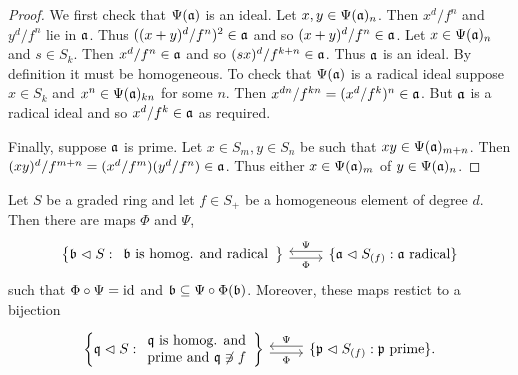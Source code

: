\documentclass{memoir}
\begin{document}
\begin{proof}
    We first check that $\Psi(\mathfrak{a})$ is an ideal.
    Let $x,y\in \Psi(\mathfrak{a})_n$.
    Then $x^d/f^n$ and $y^d/f^n$ lie in $\mathfrak{a}$.
    Thus $((x+y)^d/f^n)^2\in \mathfrak{a}$ and so $(x+y)^d/f^n\in \mathfrak{a}$.
    Let $x\in\Psi(\mathfrak{a})_n$ and $s\in S_k$.
    Then $x^d/f^n\in \mathfrak{a}$ and so $(sx)^d/f^{k+n}\in \mathfrak{a}$.
    Thus $\mathfrak{a}$ is an ideal.
    By definition it must be homogeneous.
    To check that $\Psi(\mathfrak{a})$ is a radical ideal suppose $x\in S_k$ and $x^n\in \Psi(\mathfrak{a})_{kn}$ for some $n$.
    Then $x^{dn}/f^{kn} = (x^d/f^k)^n\in \mathfrak{a}$.
    But $\mathfrak{a}$ is a radical ideal and so $x^d/f^k\in \mathfrak{a}$ as required.

    Finally, suppose $\mathfrak{a}$ is prime.
    Let $x\in S_m,y\in S_n$ be such that $xy\in \Psi(\mathfrak{a})_{m+n}$.
    Then $(xy)^d/f^{m+n} = (x^d/f^m)(y^d/f^n)\in \mathfrak{a}$.
    Thus either $x\in \Psi(\mathfrak{a})_m$ of $y\in \Psi(\mathfrak{a})_n$.
\end{proof}
\begin{thm}
    \label{thm:f_loc}
    Let $S$ be a graded ring and let $f\in S_+$ be a homogeneous element of degree $d$.
    Then there are maps $\Phi$ and $\Psi$,
    \begin{equation}
        \begin{tikzcd}
            \left\{\mf b \normal S : \begin{array}{c} \mf b \text{ is homog. and radical}\end{array}\right\} \arrow[r,shift right,swap,"\Phi"] & \set{\mf a \normal S_{(f)}: \mf a\text{ radical}} \arrow[l,shift right,swap,"\Psi"]
        \end{tikzcd}
    \end{equation}
    such that $\Phi\circ \Psi = \operatorname{id}$ and $\mathfrak{b}\subseteq \Psi\circ\Phi(\mathfrak{b})$.
    Moreover, these maps restict to a bijection
    \begin{equation}
        \begin{tikzcd}
            \left\{\mf q \normal S : \begin{array}{c} \mf q \text{ is homog. and} \\ \text{prime and } \mf q\not\ni f \end{array}\right\} \arrow[r,shift right,swap,"\Phi"] & \set{\mf p \normal S_{(f)}: \mf p\text{ prime}} \arrow[l,shift right,swap,"\Psi"].
        \end{tikzcd}
    \end{equation}
\end{thm}
\end{document}
